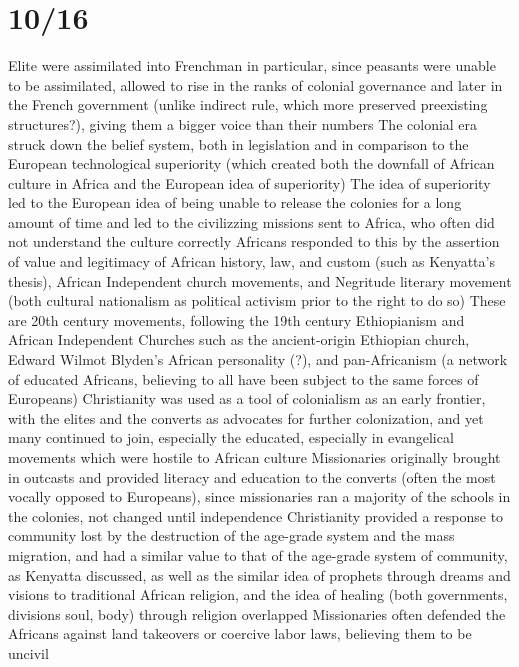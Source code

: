 \documentclass[11 pt, twoside]{article}
\newenvironment{outline*}
{
	\begin{outline}[enumerate]
	}
	{\end{outline}
}
\begin{document}
\section{10/16}
\begin{outline*}
\1 Elite were assimilated into Frenchman in particular, since peasants were unable to be assimilated, allowed to rise in the ranks of colonial governance and later in the French government (unlike indirect rule, which more preserved preexisting structures?), giving them a bigger voice than their numbers
\1 The colonial era struck down the belief system, both in legislation and in comparison to the European technological superiority (which created both the downfall of African culture in Africa and the European idea of superiority)
	\2 The idea of superiority led to the European idea of being unable to release the colonies for a long amount of time and led to the civilizzing missions sent to Africa, who often did not understand the culture correctly
	\2 Africans responded to this by the assertion of value and legitimacy of African history, law, and custom (such as Kenyatta's thesis), African Independent church movements, and Negritude literary movement (both cultural nationalism as political activism prior to the right to do so)
		\3 These are 20th century movements, following the 19th century Ethiopianism and African Independent Churches such as the ancient-origin Ethiopian church, Edward Wilmot Blyden's African personality (?), and pan-Africanism (a network of educated Africans, believing to all have been subject to the same forces of Europeans)
		\3 Christianity was used as a tool of colonialism as an early frontier, with the elites and the converts as advocates for further colonization, and yet many continued to join, especially the educated, especially in evangelical movements which were hostile to African culture
			\4 Missionaries originally brought in outcasts and provided literacy and education to the converts (often the most vocally opposed to Europeans), since missionaries ran a majority of the schools in the colonies, not changed until independence
			\4 Christianity provided a response to community lost by the destruction of the age-grade system and the mass migration, and had a similar value to that of the age-grade system of community, as Kenyatta discussed, as well as the similar idea of prophets through dreams and visions to traditional African religion, and the idea of healing (both governments, divisions soul, body) through religion overlapped
			\4 Missionaries often defended the Africans against land takeovers or coercive labor laws, believing them to be uncivil

\end{outline*}
\end{document}
